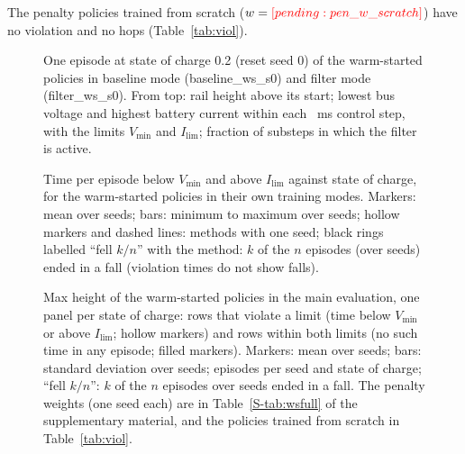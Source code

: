 The penalty policies trained from scratch ($w=\res{pen_w_scratch}$) have no violation and no hops (Table~\ref{tab:viol}).
\begin{table}[tbp]\centering\caption{Policies trained from scratch: violations and task performance by method and state of charge (SOC) (mean over seeds;  episodes per seed and state of charge). Falls: fraction of episodes. Standard deviations, lowest bus voltage, mean apex and return: full version, Table~\ref{S-tab:violfull} of the supplementary material.}\label{tab:viol}
\end{table}
\begin{table}[tbp]\centering\caption{Warm-started policies with three seeds, each continued from the baseline policy of the same seed: violations and task performance by method and state of charge (mean over seeds;  episodes per seed and state of charge). Falls: fraction of episodes. The full version, with standard deviations, the penalty weights  (one seed) and the other policies with the filter at test time, is Table~\ref{S-tab:wsfull} of the supplementary material.}\label{tab:ws}
\end{table}
\begin{figure}[tbp]\centering{}\caption{One episode at state of charge 0.2 (reset seed 0) of the warm-started policies in baseline mode (baseline\_ws\_s0) and filter mode (filter\_ws\_s0). From top: rail height above its start; lowest bus voltage and highest battery current within each ~ms control step, with the limits $V_{\min}$ and $I_{\lim}$; fraction of substeps in which the filter is active.}\label{fig:traces}\end{figure}
\begin{figure}[tbp]\centering{}\caption{Time per episode below $V_{\min}$ and above $I_{\lim}$ against state of charge, for the warm-started policies in their own training modes. Markers: mean over seeds; bars: minimum to maximum over seeds; hollow markers and dashed lines: methods with one seed; black rings labelled ``fell $k/n$'' with the method: $k$ of the $n$ episodes (over seeds) ended in a fall (violation times do not show falls).}\label{fig:violsoc}\end{figure}\begin{figure}[tbp]\centering{}\caption{Max height of the warm-started policies in the main evaluation, one panel per state of charge: rows that violate a limit (time below $V_{\min}$ or above $I_{\lim}$; hollow markers) and rows within both limits (no such time in any episode; filled markers). Markers: mean over  seeds; bars: standard deviation over seeds;  episodes per seed and state of charge; ``fell $k/n$'': $k$ of the $n$ episodes over seeds ended in a fall. The penalty weights  (one seed each) are in Table~\ref{S-tab:wsfull} of the supplementary material, and the policies trained from scratch in Table~\ref{tab:viol}.}\label{fig:tradeoff}\end{figure}

